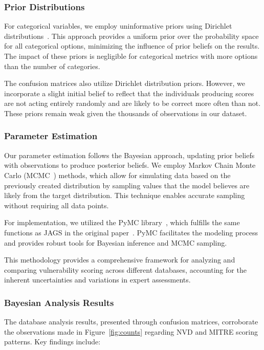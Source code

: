 \documentclass[12pt]{article}
\begin{document}
\subsubsection{Prior Distributions}

For categorical variables, we employ uninformative priors using Dirichlet distributions~\cite{dirichlet}. This
approach provides a uniform prior over the probability space for all categorical options, minimizing
the influence of prior beliefs on the results. The impact of these priors is negligible for
categorical metrics with more options than the number of categories.

The confusion matrices also utilize Dirichlet distribution priors. However, we incorporate a slight
initial belief to reflect that the individuals producing scores are not acting entirely randomly and
are likely to be correct more often than not. These priors remain weak given the thousands of
observations in our dataset.

\subsubsection{Parameter Estimation}

Our parameter estimation follows the Bayesian approach, updating prior beliefs with observations to
produce posterior beliefs. We employ Markov Chain Monte Carlo (MCMC~\cite{mcmc}) methods, which allow for
simulating data based on the previously created distribution by sampling values that the model
believes are likely from the target distribution. This technique enables accurate sampling without
requiring all data points.

For implementation, we utilized the PyMC library~\cite{pymc}, which fulfills the same functions as
JAGS in the original paper~\cite{bayes}. PyMC facilitates the modeling process and provides robust
tools for Bayesian inference and MCMC sampling.

This methodology provides a comprehensive framework for analyzing and comparing vulnerability
scoring across different databases, accounting for the inherent uncertainties and variations in
expert assessments.


\subsubsection{Bayesian Analysis Results}

The database analysis results, presented through confusion matrices, corroborate the observations
made in Figure~\ref{fig:counts} regarding NVD and MITRE scoring patterns. Key findings include:
\end{document}
